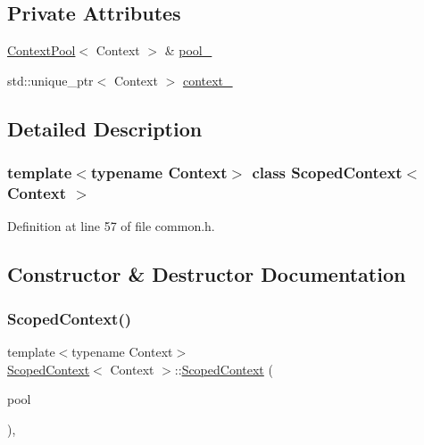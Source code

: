 \subsection*{Private Attributes}
\begin{DoxyCompactItemize}
\item 
\mbox{\hyperlink{common_8h_a59ab5d85bff9594312b035d548be298f}{Context\+Pool}}$<$ Context $>$ \& \mbox{\hyperlink{class_scoped_context_a6aa628deb422cd0304c7b2eb311f8185}{pool\+\_\+}}
\item 
std\+::unique\+\_\+ptr$<$ Context $>$ \mbox{\hyperlink{class_scoped_context_afe2f4971fc3620e98791cc844454956e}{context\+\_\+}}
\end{DoxyCompactItemize}


\subsection{Detailed Description}
\subsubsection*{template$<$typename Context$>$\newline
class Scoped\+Context$<$ Context $>$}



Definition at line 57 of file common.\+h.



\subsection{Constructor \& Destructor Documentation}
\mbox{\label{class_scoped_context_a47e87cd0b7ce580d53fbb7f1bb36a4c3}} 
\subsubsection{\texorpdfstring{Scoped\+Context()}{ScopedContext()}}
{\footnotesize\ttfamily template$<$typename Context$>$ \\
\mbox{\hyperlink{class_scoped_context}{Scoped\+Context}}$<$ Context $>$\+::\mbox{\hyperlink{class_scoped_context}{Scoped\+Context}} (\begin{DoxyParamCaption}\item[{\mbox{\hyperlink{common_8h_a59ab5d85bff9594312b035d548be298f}{Context\+Pool}}$<$ Context $>$ \&}]{pool }\end{DoxyParamCaption})\hspace{0.3cm}{\ttfamily [inline]}, {\ttfamily [explicit]}}



